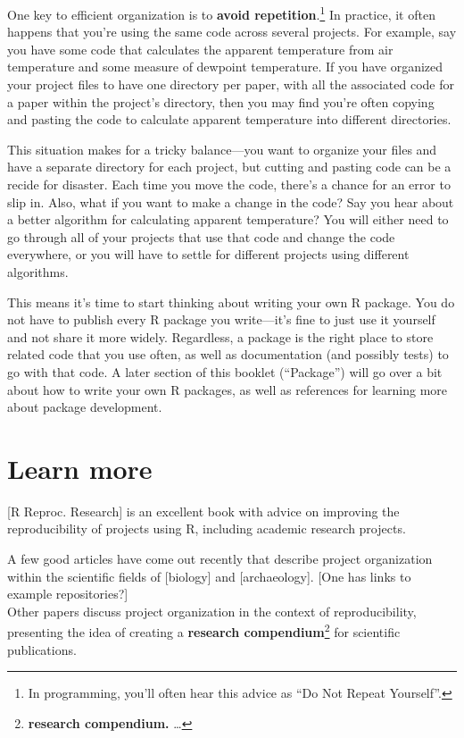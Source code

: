 \documentclass[]{tufte-book}
\begin{document}
One key to efficient organization is to \textbf{avoid repetition}.\footnote{In programming,
  you'll often hear this advice as ``Do Not Repeat Yourself''.} In practice, it
often happens that you're using the same code across several projects. For
example, say you have some code that calculates the apparent temperature from
air temperature and some measure of dewpoint temperature. If you have organized
your project files to have one directory per paper, with all the associated code
for a paper within the project's directory, then you may find you're often
copying and pasting the code to calculate apparent temperature into different
directories.

This situation makes for a tricky balance---you want to organize your files and
have a separate directory for each project, but cutting and pasting code can be
a recide for disaster. Each time you move the code, there's a chance for an
error to slip in. Also, what if you want to make a change in the code? Say you
hear about a better algorithm for calculating apparent temperature? You will
either need to go through all of your projects that use that code and change the
code everywhere, or you will have to settle for different projects using
different algorithms.

This means it's time to start thinking about writing your own R package. You do
not have to publish every R package you write---it's fine to just use it
yourself and not share it more widely. Regardless, a package is the right place
to store related code that you use often, as well as documentation (and possibly
tests) to go with that code. A later section of this booklet (``Package'') will go
over a bit about how to write your own R packages, as well as references for
learning more about package development.

\hypertarget{learn-more}{%
\section{Learn more}\label{learn-more}}

{[}R Reproc. Research{]} is an excellent book with advice on improving the reproducibility of
projects using R, including academic research projects.

A few good articles have come out recently that describe project organization within
the scientific fields of {[}biology{]} and {[}archaeology{]}. {[}One has links to example repositories?{]}\\
Other papers discuss project organization in the context of reproducibility, presenting
the idea of creating a \textbf{research compendium}\footnote{\textbf{research compendium.} \ldots{}} for scientific
publications.
\end{document}
